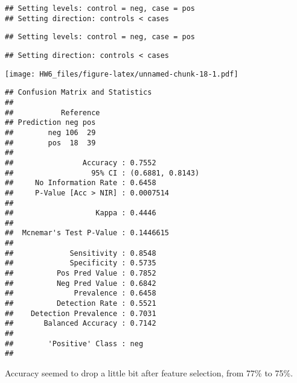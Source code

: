 \documentclass[]{article}
\newenvironment{Shaded}{\begin{snugshade}}{\end{snugshade}}
\newcommand{\DataTypeTok}[1]{\textcolor[rgb]{0.13,0.29,0.53}{#1}}
\newcommand{\KeywordTok}[1]{\textcolor[rgb]{0.13,0.29,0.53}{\textbf{#1}}}
\newcommand{\NormalTok}[1]{#1}
\newcommand{\OperatorTok}[1]{\textcolor[rgb]{0.81,0.36,0.00}{\textbf{#1}}}
\newcommand{\StringTok}[1]{\textcolor[rgb]{0.31,0.60,0.02}{#1}}
\begin{document}
\begin{verbatim}
## Setting levels: control = neg, case = pos
## Setting direction: controls < cases
\end{verbatim}

\begin{verbatim}
## Setting levels: control = neg, case = pos
\end{verbatim}

\begin{verbatim}
## Setting direction: controls < cases
\end{verbatim}

\texttt{[image: HW6\_files/figure-latex/unnamed-chunk-18-1.pdf]}

\begin{Shaded}
\end{Shaded}

\begin{verbatim}
## Confusion Matrix and Statistics
## 
##           Reference
## Prediction neg pos
##        neg 106  29
##        pos  18  39
##                                           
##                Accuracy : 0.7552          
##                  95% CI : (0.6881, 0.8143)
##     No Information Rate : 0.6458          
##     P-Value [Acc > NIR] : 0.0007514       
##                                           
##                   Kappa : 0.4446          
##                                           
##  Mcnemar's Test P-Value : 0.1446615       
##                                           
##             Sensitivity : 0.8548          
##             Specificity : 0.5735          
##          Pos Pred Value : 0.7852          
##          Neg Pred Value : 0.6842          
##              Prevalence : 0.6458          
##          Detection Rate : 0.5521          
##    Detection Prevalence : 0.7031          
##       Balanced Accuracy : 0.7142          
##                                           
##        'Positive' Class : neg             
## 
\end{verbatim}

Accuracy seemed to drop a little bit after feature selection, from 77\%
to 75\%.
\end{document}
